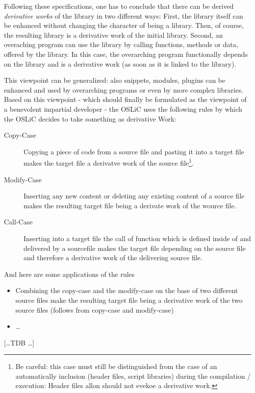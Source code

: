 Following these specifications, one has to conclude that there can be derived
\emph{derivative works} of the library in two different ways: First, the library
itself can be enhanced without changing the character of being a library. Then,
of course, the resulting library is a derivative work of the initial library.
Second, an overaching program can use the library by calling functions, methods
or data, offered by the library. In this case, the overarching program
functionally depends on the library and is a derivative work (as soon as it is
linked to the library).

This viewpoint can be generalized: also snippets, modules, plugins can be
enhanced and used by overarching programs or even by more complex libraries.
Based on this viewpoint - which should finally be formulated as the viewpoint of
a benevolent impartial developer - the OSLiC uses the following rules by which
the OSLiC decides to take something as derivative Work:
\label{sec:BenevolentDerivativeWorkUnderstanding}

\begin{description}
  \item[Copy-Case] Copying a piece of code from a source file and pasting it
  into a target file makes the target file a derivatve work of the source
  file\footnote{ Be careful: this case must still be distinguished from the case
  of an automatically inclusion (header files, script libraries) during the
  compilation / execution: Header files allon should not evekoe a derivative
  work.}.
  \item[Modify-Case] Inserting any new content or deleting any existing content
  of a source file makes the resulting target file being a derivate work of the
  wource file.
  \item[Call-Case] Inserting into a target file the call of function which is
  defined inside of and delivered by a sourcefile makes the target file
  depending on the source file and therefore a derivative work of the delivering
  source file.
\end{description}

And here are some applications of the rules

\begin{itemize}
  \item Combining the copy-case and the modify-case on the base of two
  different source files make the resulting target file being a derivative work
  of the two source files (follows from copy-case and modify-case)
  \item \ldots
\end{itemize}

[\ldots TDB \ldots]

%
